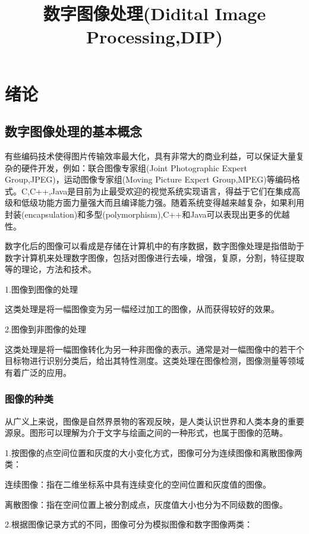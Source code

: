 \documentclass[11pt]{article}
\begin{document}
	\title{数字图像处理(Didital Image Processing,DIP)}
	
	\maketitle
	
	\newpage
	\tableofcontents
	\newpage
	
\section{绪论}
\subsection{数字图像处理的基本概念}

有些编码技术使得图片传输效率最大化，具有非常大的商业利益，可以保证大量复杂的硬件开发，例如：联合图像专家组(Joint Photographic Expert Group,JPEG)，运动图像专家组(Moving Picture Expert Group,MPEG)等编码格式。C,C++,Java是目前为止最受欢迎的视觉系统实现语言，得益于它们在集成高级和低级功能方面力量强大而且编译能力强。随着系统变得越来越复杂，如果利用封装(encapsulation)和多型(polymorphism),C++和Java可以表现出更多的优越性。

数字化后的图像可以看成是存储在计算机中的有序数据，数字图像处理是指借助于数字计算机来处理数字图像，包括对图像进行去噪，增强，复原，分割，特征提取等的理论，方法和技术。

\noindent1.图像到图像的处理

这类处理是将一幅图像变为另一幅经过加工的图像，从而获得较好的效果。

\noindent2.图像到非图像的处理

这类处理是将一幅图像转化为另一种非图像的表示。通常是对一幅图像中的若干个目标物进行识别分类后，给出其特性测度。这类处理在图像检测，图像测量等领域有着广泛的应用。
\subsubsection{图像的种类}
从广义上来说，图像是自然界景物的客观反映，是人类认识世界和人类本身的重要源泉。图形可以理解为介于文字与绘画之间的一种形式，也属于图像的范畴。

\noindent1.按图像的点空间位置和灰度的大小变化方式，图像可分为连续图像和离散图像两类：

连续图像：指在二维坐标系中具有连续变化的空间位置和灰度值的图像。

离散图像：指在空间位置上被分割成点，灰度值大小也分为不同级数的图像。

\noindent2.根据图像记录方式的不同，图像可分为模拟图像和数字图像两类：
\end{document}
